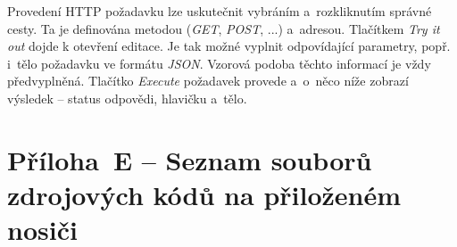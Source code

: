 \documentclass[a4paper,12pt]{article}
\begin{document}
Provedení HTTP požadavku lze uskutečnit vybráním a~rozkliknutím správné cesty. Ta je definována metodou (\textit{GET}, \textit{POST}, ...) a~adresou. Tlačítkem \textit{Try it out} dojde k otevření editace. Je tak možné vyplnit odpovídající parametry, popř. i~tělo požadavku ve formátu \textit{JSON}. Vzorová podoba těchto informací je vždy předvyplněná. Tlačítko \textit{Execute} požadavek provede a~o~něco níže zobrazí výsledek -- status odpovědi, hlavičku a~tělo.

\clearpage {}\label{prilohaE} 

\section*{Příloha~E --  Seznam souborů zdrojových kódů na přiloženém nosiči}
\end{document}
